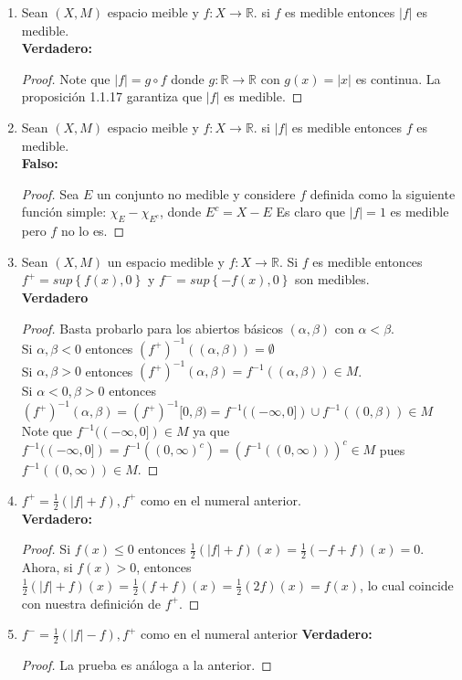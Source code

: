 \documentclass[spanish,12pt,a4paper,openany]{book}
\begin{document}
		\begin{enumerate}
			\item  Sean $(X,M)$ espacio meible y $f: X \rightarrow \mathbb{R}.$ si $f$ es medible entonces $|f|$ es medible.\\
			\textbf{Verdadero:}
			\begin{proof}
				Note que $|f| = g \circ f$ donde $g: \mathbb{R} \rightarrow \mathbb{R}$ con  $g(x)=|x|$ es continua. La proposición 1.1.17 garantiza que $|f|$ es medible.
			\end{proof}
			\item Sean $(X,M)$ espacio meible y $f: X \rightarrow \mathbb{R}.$ si $|f|$ es medible entonces $f$ es medible.\\
			\textbf{Falso:}
			\begin{proof}
				Sea $E$ un conjunto no medible y considere $f$ definida como la siguiente función simple: $\chi_{E} - \chi_{E^{c}}$, donde $E^{c} = X-E$
				Es claro que $|f| = 1$ es medible pero $f$ no lo es.
			\end{proof}
			\item Sean $(X,M)$ un espacio medible y $f: X \rightarrow \mathbb{R}$. Si $f$ es medible entonces $f^{+} = sup \left\{ f(x),0 \right\}$ y $f^{-} = sup \left\{-f(x), 0 \right\}$ son medibles.\\
			\textbf{Verdadero}
			\begin{proof}
				Basta probarlo para los abiertos básicos $(\alpha, \beta )$ con $\alpha < \beta$. \\
				Si $\alpha , \beta <0$ entonces $(f^{+})^{-1} ((\alpha, \beta)) = \emptyset$\\
				Si $\alpha, \beta > 0 $ entonces $(f^{+})^{-1} (\alpha, \beta) = f^{-1} ((\alpha, \beta)) \in M$.\\
				Si $\alpha <0, \beta > 0 $ entonces $(f^{+})^{-1} (\alpha, \beta) = (f^{+})^{-1} [0, \beta) = f^{-1} ((-\infty, 0]) \cup f^{-1} ((0, \beta)) \in M$ Note que $f^{-1} ((-\infty, 0]) \in M$ ya que $f^{-1} ((-\infty, 0]) = f^{-1} ((0, \infty)^{c}) = (f^{-1} ((0, \infty)))^{c} \in M$ pues $f^{-1}((0, \infty)) \in M$.
			\end{proof}
			\item $f^{+} = \frac{1}{2} \left(|f| + f \right), f^{+}$ como en el numeral anterior.\\
			\textbf{Verdadero:}
			\begin{proof}
				Si $f(x) \leq 0$ entonces $\frac{1}{2} \left(|f| + f \right) (x) = \frac{1}{2} \left(-f + f \right)(x) = 0$. Ahora, si $f(x)>0$, entonces $\frac{1}{2} \left(|f| + f \right)(x) = \frac{1}{2} \left(f + f \right)(x) = \frac{1}{2}(2f)(x) = f(x)$, lo cual coincide con nuestra definición de $f^{+}$.
			\end{proof}
			\item $f^{-} = \frac{1}{2} \left(|f| - f \right), f^{+}$ como en el numeral anterior
			\textbf{Verdadero:}
			\begin{proof}
				La prueba es análoga a la anterior.
			\end{proof}
		\end{enumerate}
\end{document}
